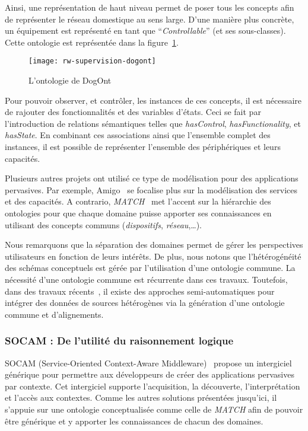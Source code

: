 Ainsi, une représentation de haut niveau permet de poser tous les concepts afin de représenter le réseau domestique au sens large. D'une manière plus concrète, un équipement est représenté en tant que \enquote{\it Controllable} (et ses sous-classes). Cette ontologie est représentée dans la figure~\ref{fig:rw:supervision:dogont}.

\begin{figure}[ht]
    \centering
    \texttt{[image: rw-supervision-dogont]}
    \caption{L'ontologie de DogOnt}\label{fig:rw:supervision:dogont}
\end{figure}
Pour pouvoir observer, et contrôler, les instances de ces concepts, il est nécessaire de rajouter des fonctionnalités et des variables d'états. Ceci se fait par l'introduction de relations sémantiques telles que \textit{hasControl}, \textit{hasFunctionality}, et \textit{hasState}. En combinant ces associations ainsi que l'ensemble complet des instances, il est possible de représenter l'ensemble des périphériques et leurs capacités.

Plusieurs autres projets ont utilisé ce type de modélisation pour des applications pervasives. Par exemple, Amigo~\cite{BenMokhtar:easy} se focalise plus sur la modélisation des services et des capacités. A contrario, \textit{MATCH}~\cite{Docherty:match} met l'accent sur la hiérarchie des ontologies pour que chaque domaine puisse apporter ses connaissances en utilisant des concepts communs (\textit{dispositifs}, \textit{réseau},\dots).

Nous remarquons que la séparation des domaines permet de gérer les perspectives utilisateurs en fonction de leurs intérêts. De plus, nous notons que l'hétérogénéité des schémas conceptuels est gérée par l'utilisation d'une ontologie commune. La nécessité d'une ontologie commune est récurrente dans ces travaux. Toutefois, dans des travaux récents~\cite{Niang:global,Niang:integration}, il existe des approches semi-automatiques pour intégrer des données de sources hétérogènes via la génération d'une ontologie commune et d'alignements.

\subsubsection{SOCAM : De l'utilité du raisonnement logique}
SOCAM (Service-Oriented Context-Aware Middleware)~\cite{Gu:socam} propose un intergiciel générique pour permettre aux développeurs de créer des applications pervasives par contexte. Cet intergiciel supporte l'acquisition, la découverte, l'interprétation et l'accès aux contextes. Comme les autres solutions présentées jusqu'ici, il s'appuie sur une ontologie conceptualisée comme celle de \textit{MATCH} afin de pouvoir être générique et y apporter les connaissances de chacun des domaines.

